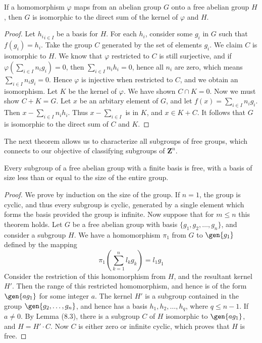 \begin{lemma}
    If a homomorphism $\varphi$ maps from an abelian group $G$ onto a free abelian group $H$, then $G$ is isomorphic to the direct sum of the kernel of $\varphi$ and $H$.
\end{lemma}
\begin{proof}
    Let ${h_i}_{i \in I}$ be a basis for $H$. For each $h_i$, consider some $g_i$ in $G$ such that $f(g_i) = h_i$. Take the group $C$ generated by the set of elements $g_i$. We claim $C$ is isomorphic to $H$. We know that $\varphi$ restricted to $C$ is still surjective, and if $\varphi(\sum_{i \in I} n_ig_i) = 0$, then $\sum_{i \in I} n_ih_i = 0$, hence all $n_i$ are zero, which means $\sum_{i \in I} n_ig_i = 0$. Hence $\varphi$ is injective when restricted to $C$, and we obtain an isomorphism. Let $K$ be the kernel of $\varphi$. We have shown $C \cap K = 0$. Now we must show $C + K = G$. Let $x$ be an arbitary element of $G$, and let $f(x) = \sum_{i \in I} n_ig_i$. Then $x - \sum_{i \in I} n_ih_i$. Thus $x - \sum_{i \in I}$ is in $K$, and $x \in K + C$. It follows that $G$ is isomorphic to the direct sum of $C$ and $K$.
\end{proof}

The next theorem allows us to characterize all subgroups of free groups, which connects to our objective of classifying subgroups of $\mathbf{Z}^n$.

\begin{theorem}
    Every subgroup of a free abelian group with a finite basis is free, with a basis of size less than or equal to the size of the entire group.
\end{theorem}
\begin{proof}
    We prove by induction on the size of the group. If $n = 1$, the group is cyclic, and thus every subgroup is cyclic, generated by a single element which forms the basis provided the group is infinite. Now suppose that for $m \leq n$ this theorem holds. Let $G$ be a free abelian group with basis $\{ g_1, g_2, \dots, g_n \}$, and consider a subgroup $H$. We have a homomorphism $\pi_1$ from $G$ to $\gen{g_1}$ defined by the mapping
    \[ \pi_1(\sum_{k = 1}^n l_kg_k) = l_1g_1 \]
    Consider the restriction of this homomorphism from $H$, and the resultant kernel $H'$. Then the range of this restricted homomorphism, and hence is of the form $\gen{ag_1}$ for some integer $a$. The kernel $H'$ is a subgroup contained in the group $\gen{g_2, \dots, g_n}$, and hence has a basis $h_1, h_2, \dots, h_q$, where $q \leq n-1$. If $a \neq 0$. By Lemma (8.3), there is a subgroup $C$ of $H$ isomorphic to $\gen{ag_1}$, and $H = H' \cdotp C$. Now $C$ is either zero or infinite cyclic, which proves that $H$ is free.
\end{proof}

